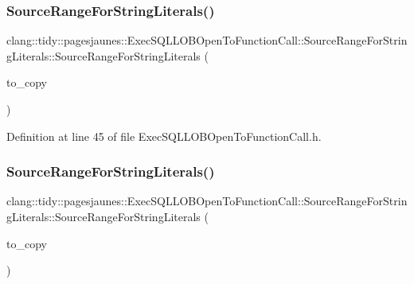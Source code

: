 \subsubsection{\texorpdfstring{Source\+Range\+For\+String\+Literals()}{SourceRangeForStringLiterals()}\hspace{0.1cm}{\footnotesize\ttfamily [4/6]}}
{\footnotesize\ttfamily clang\+::tidy\+::pagesjaunes\+::\+Exec\+S\+Q\+L\+L\+O\+B\+Open\+To\+Function\+Call\+::\+Source\+Range\+For\+String\+Literals\+::\+Source\+Range\+For\+String\+Literals (\begin{DoxyParamCaption}\item[{\hyperlink{classclang_1_1tidy_1_1pagesjaunes_1_1_exec_s_q_l_l_o_b_open_to_function_call_1_1_source_range_for_string_literals}{Source\+Range\+For\+String\+Literals} const \&}]{to\+\_\+copy }\end{DoxyParamCaption})\hspace{0.3cm}{\ttfamily [inline]}}



Definition at line 45 of file Exec\+S\+Q\+L\+L\+O\+B\+Open\+To\+Function\+Call.\+h.

\mbox{\label{classclang_1_1tidy_1_1pagesjaunes_1_1_exec_s_q_l_l_o_b_open_to_function_call_1_1_source_range_for_string_literals_ab80f07edbc79c4e2908bd5335dc4b760}} 
\subsubsection{\texorpdfstring{Source\+Range\+For\+String\+Literals()}{SourceRangeForStringLiterals()}\hspace{0.1cm}{\footnotesize\ttfamily [5/6]}}
{\footnotesize\ttfamily clang\+::tidy\+::pagesjaunes\+::\+Exec\+S\+Q\+L\+L\+O\+B\+Open\+To\+Function\+Call\+::\+Source\+Range\+For\+String\+Literals\+::\+Source\+Range\+For\+String\+Literals (\begin{DoxyParamCaption}\item[{\hyperlink{classclang_1_1tidy_1_1pagesjaunes_1_1_exec_s_q_l_l_o_b_open_to_function_call_1_1_source_range_for_string_literals}{Source\+Range\+For\+String\+Literals} $\ast$}]{to\+\_\+copy }\end{DoxyParamCaption})\hspace{0.3cm}{\ttfamily [inline]}}



